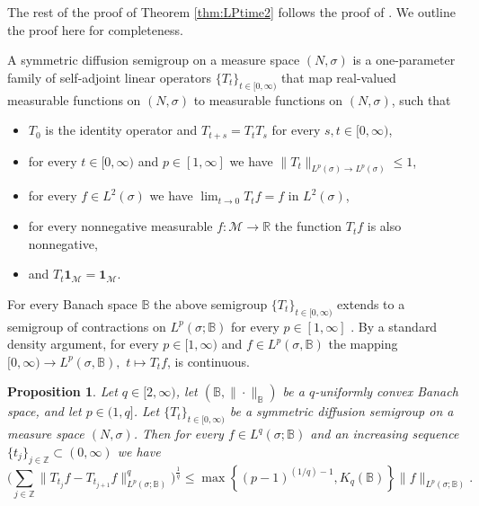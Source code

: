 \documentclass[11pt,reqno]{amsart}
\newtheorem{proposition}[theorem]{Proposition}
\newcommand{\Z}{\mathbb{Z}}
\newcommand{\1}{\mathbf 1}
\newcommand{\R}{\mathbb{R}}
\newcommand{\Norm}[2]{\|#1\|_{#2}}
\begin{document}
The rest of the proof of Theorem \ref{thm:LPtime2} follows the proof of \cite[Theorem 17]{hytonen2019heat}. We outline the proof here for completeness.

A symmetric diffusion semigroup \cite[page~65]{stein2016topics} on a measure space $(N,\sigma)$ is a one-parameter family of self-adjoint linear operators $\{T_t\}_{t\in [0,\infty)}$ that map real-valued measurable functions on $(N,\sigma)$ to measurable functions on $(N,\sigma)$, such that
\begin{itemize}
	\item $T_0$ is the identity operator and $T_{t+s}=T_tT_s$ for every $s,t \in [0,\infty)$,
	\item for every $t\in [0,\infty)$ and $p\in [1,\infty]$ we have  $\|T_t\|_{L^p(\sigma)\to L^p(\sigma)}\le 1$,
	\item for every $f\in L^2(\sigma)$ we have $\lim_{t\to 0} T_tf=f$ in $L^2(\sigma)$,
	\item for every nonnegative measurable $f:\mathscr{M}\to \R$ the function $T_tf$ is also nonnegative,
	\item and $T_t\1_{\mathscr{M}}=\1_{\mathscr{M}}$.
\end{itemize}
For every Banach space $\mathbb{B}$ the above semigroup $\{T_t\}_{t\in [0,\infty)}$ extends to a semigroup of contractions on $L^p(\sigma;\mathbb{B})$ for every $p\in [1,\infty]$ \cite[page~433]{martinez2006vector}. By a standard density argument, for every $p\in [1,\infty)$ and $f\in L^p(\sigma,\mathbb{B})$ the mapping $[0,\infty)\to L^p(\sigma,\mathbb{B}),$ $t\mapsto T_tf$, is continuous.




\begin{proposition}\label{prop:Rota} Let $q\in [2,\infty)$, let $(\mathbb{B},\|\cdot\|_\mathbb{B})$ be a $q$-uniformly convex Banach space, and let $p\in (1,q]$.  Let $\{T_t\}_{t\in [0,\infty)}$ be a symmetric diffusion semigroup on a measure space $(N,\sigma)$. Then for every $f\in L^q(\sigma;\mathbb{B})$ and an increasing sequence $\{t_j\}_{j\in\Z}\subset (0,\infty)$ we have
	\begin{equation}\label{eq:semigroup version UC}
		\bigg(\sum_{j\in\Z}\Norm{T_{t_j}f-T_{t_{j+1}}f}{L^p(\sigma;\mathbb{B})}^q\bigg)^{\frac{1}{q}}\le \max\left\{\left(p-1\right)^{(1/q)-1},K_q\left(\mathbb{B}\right)\right\}\Norm{f}{L^p(\sigma;\mathbb{B})}.
	\end{equation}
\end{proposition}
\end{document}
